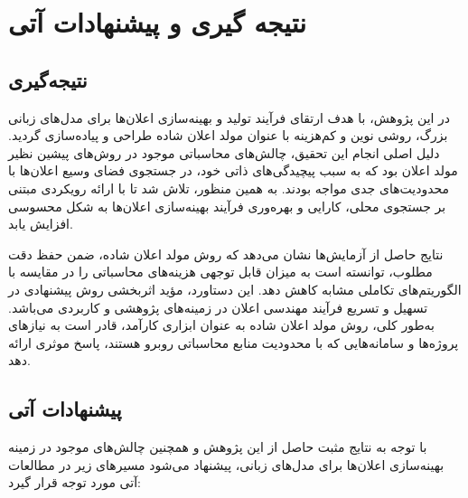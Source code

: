 \clearpage
\thispagestyle{empty}
\chapter{نتیجه گیری و پیشنهادات آتی}\label{chap5}
\section{نتیجه‌گیری}
در این پژوهش، با هدف ارتقای فرآیند تولید و بهینه‌سازی اعلان‌ها برای مدل‌های زبانی بزرگ، روشی نوین و کم‌هزینه با عنوان مولد اعلان شاده  طراحی و پیاده‌سازی گردید. دلیل اصلی انجام این تحقیق، چالش‌های محاسباتی موجود در روش‌های پیشین نظیر مولد اعلان \cite{PromptBreeder} بود که به سبب پیچیدگی‌های ذاتی خود، در جستجوی فضای وسیع اعلان‌ها با محدودیت‌های جدی مواجه بودند. به همین منظور، تلاش شد تا با ارائه رویکردی مبتنی بر جستجوی محلی، کارایی و بهره‌وری فرآیند بهینه‌سازی اعلان‌ها به شکل محسوسی افزایش یابد.

نتایج حاصل از آزمایش‌ها نشان می‌دهد که روش مولد اعلان شاده، ضمن حفظ دقت مطلوب، توانسته است به میزان قابل توجهی هزینه‌های محاسباتی را در مقایسه با الگوریتم‌های تکاملی مشابه کاهش دهد. این دستاورد، مؤید اثربخشی روش پیشنهادی در تسهیل و تسریع فرآیند مهندسی اعلان در زمینه‌های پژوهشی و کاربردی می‌باشد. به‌طور کلی، روش مولد اعلان شاده به عنوان ابزاری کارآمد، قادر است به نیازهای پروژه‌ها و سامانه‌هایی که با محدودیت منابع محاسباتی روبرو هستند، پاسخ موثری ارائه دهد.

\section{پیشنهادات آتی}
با توجه به نتایج مثبت حاصل از این پژوهش و همچنین چالش‌های موجود در زمینه بهینه‌سازی اعلان‌ها برای مدل‌های زبانی، پیشنهاد می‌شود مسیرهای زیر در مطالعات آتی مورد توجه قرار گیرد:

